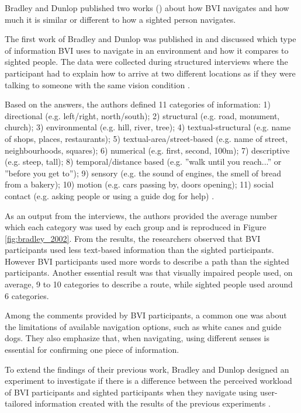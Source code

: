 Bradley and Dunlop published two works (\citeyear{bradley2002investigating,bradley2005experimental}) about how BVI navigates and how much it is similar or different to how a sighted person navigates. 

The first work of Bradley and Dunlop was published in \citeyear{bradley2002investigating} and discussed which type of information BVI uses to navigate in an environment and how it compares to sighted people. The data were collected during structured interviews where the participant had to explain how to arrive at two different locations as if they were talking to someone with the same vision condition \cite{bradley2002investigating}.

Based on the answers, the authors defined 11 categories of information: 1) directional (e.g. left/right, north/south); 2) structural (e.g. road, monument, church); 3) environmental (e.g. hill, river, tree); 4) textual-structural (e.g. name of shops, places, restaurants); 5) textual-area/street-based (e.g. name of street, neighbourhoods, squares); 6) numerical (e.g. first, second, 100m); 7) descriptive (e.g. steep, tall); 8) temporal/distance based (e.g. ”walk until you reach...” or ”before you get to”); 9) sensory (e.g. the sound of engines, the smell of bread from a bakery); 10) motion (e.g. cars passing by, doors opening); 11) social contact (e.g. asking people or using a guide dog for help) \cite{bradley2002investigating}.

As an output from the interviews, the authors provided the average number which each category was used by each group and is reproduced in Figure \ref{fig:bradley_2002}. From the results, the researchers observed that BVI participants used less text-based information than the sighted participants. However BVI participants used more words to describe a path than the sighted participants. Another essential result was that visually impaired people used, on average, 9 to 10 categories to describe a route, while sighted people used around 6 categories.



Among the comments provided by BVI participants, a common one was about the limitations of available navigation options, such as white canes and guide dogs. They also emphasize that, when navigating, using different senses is essential for confirming one piece of information. 

To extend the findings of their previous work, Bradley and Dunlop designed an experiment to investigate if there is a difference between the perceived workload of BVI participants and sighted participants when they navigate using user-tailored information created with the results of the previous experiments \cite{bradley2005experimental}.

